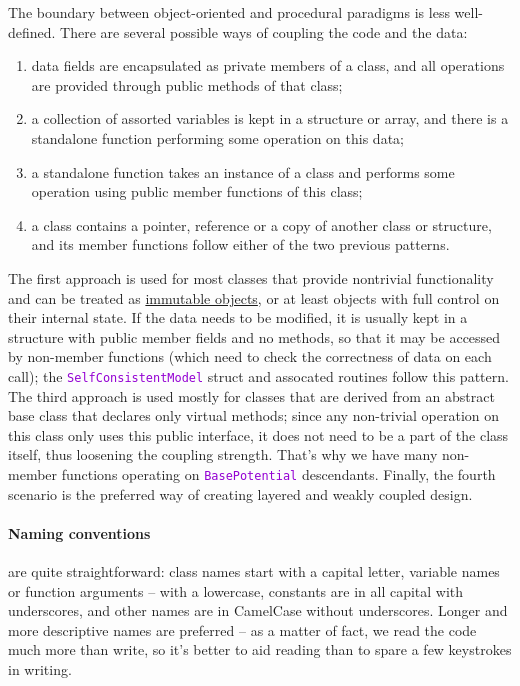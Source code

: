 \documentclass[12pt]{article}
\newcommand{\ttt}[1]{\textcolor{darkviolet}{\texttt{#1}}}
\begin{document}
The boundary between object-oriented and procedural paradigms is less well-defined. There are several possible ways of coupling the code and the data:
\begin{enumerate} \setlength{\parskip}{2pt} \setlength{\itemsep}{2pt}
\item data fields are encapsulated as private members of a class, and all operations are provided through public methods of that class;
\item a collection of assorted variables is kept in a structure or array, and there is a standalone function performing some operation on this data;
\item a standalone function takes an instance of a class and performs some operation using public member functions of this class;
\item a class contains a pointer, reference or a copy of another class or structure, and its member functions follow either of the two previous patterns.
\end{enumerate}

The first approach is used for most classes that provide nontrivial functionality and can be treated as \hyperref[sec:Const]{immutable objects}, or at least objects with full control on their internal state. If the data needs to be modified, it is usually kept in a structure with public member fields and no methods, so that it may be accessed by non-member functions (which need to check the correctness of data on each call); the \ttt{SelfConsistentModel} struct and assocated routines follow this pattern. The third approach is used mostly for classes that are derived from an abstract base class that declares only virtual methods; since any non-trivial operation on this class only uses this public interface, it does not need to be a part of the class itself, thus loosening the coupling strength. That's why we have many non-member functions operating on \ttt{BasePotential} descendants. Finally, the fourth scenario is the preferred way of creating layered and weakly coupled design.

\paragraph{Naming conventions}  are quite straightforward: class names start with a capital letter, variable names or function arguments -- with a lowercase, constants are in all capital with underscores, and other names are in CamelCase without underscores. Longer and more descriptive names are preferred -- as a matter of fact, we read the code much more than write, so it's better to aid reading than to spare a few keystrokes in writing.
\end{document}
